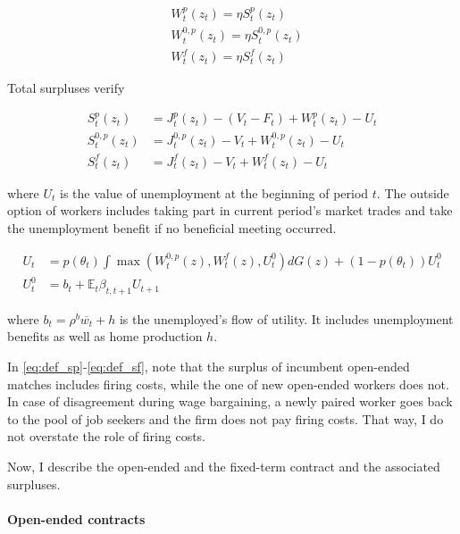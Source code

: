 \begin{align}
&W_t^p \left( z_t \right) = \eta S_t^p \left( z_t \right) \label{eq:nash_p}\\
&W_t^{0,p} \left( z_t \right) = \eta S_t^{0,p} \left( z_t \right) \label{eq:nash_0p}\\
&W_t^f \left( z_t \right) = \eta S_t^f \left( z_t \right) \label{eq:nash_f}
\end{align}

Total surpluses verify

\begin{align}
S_t^p \left( z_t \right) &= J_t^p \left( z_t \right) - \left( V_t - F_t \right) + W_t^p \left( z_t \right) - U_t \label{eq:def_sp}\\
S_t^{0,p} \left( z_t \right) &= J_t^{0,p} \left( z_t \right) - V_t + W_t^{0,p} \left( z_t \right) - U_t \label{eq:def_s0p}\\
S_t^{f} \left( z_t \right) &= J_t^{f} \left( z_t \right) - V_t + W_t^{f} \left( z_t \right) - U_t \label{eq:def_sf}
\end{align}

where $U_t$ is the value of unemployment at the beginning of period $t$. The outside option of workers includes taking part in current period's market trades and take the unemployment benefit if no beneficial meeting occurred.

\begin{align}
U_t &= p\left( \theta_t \right) \int \max \left( W_t^{0,p} (z), W_t^f (z), U_t^0 \right) dG(z) + \left( 1 - p\left( \theta_t \right) \right)U_t^0 \label{eq:U} \\
U_t^0 &= b_t + \mathbb{E}_t \beta_{t, t+1} U_{t+1} 
\end{align}

where $b_t = \rho^b \overline{w_t} + h$ is the unemployed's flow of utility. It includes unemployment benefits as well as home production $h$. 

In \eqref{eq:def_sp}-\eqref{eq:def_sf}, note that the surplus of incumbent open-ended matches includes firing costs, while the one of new open-ended workers does not. In case of disagreement during wage bargaining, a newly paired worker goes back to the pool of job seekers and the firm does not pay firing costs. That way, I do not overstate the role of firing costs.

Now, I describe the open-ended and the fixed-term contract and the associated surpluses.

\paragraph{Open-ended contracts}

